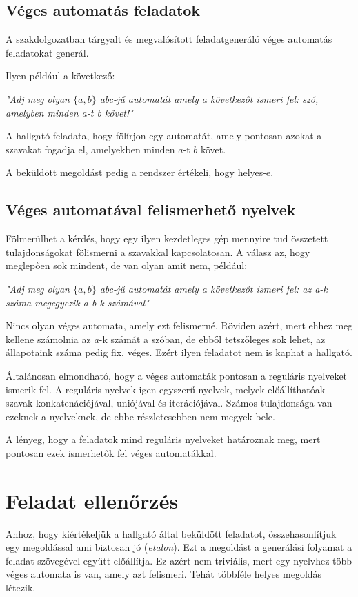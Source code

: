 \documentclass[12pt]{report}
\theoremstyle{definition}
\begin{document}
\subsection{Véges automatás feladatok}
A szakdolgozatban tárgyalt és megvalósított feladatgeneráló véges automatás feladatokat generál.

Ilyen például a következő:

\textit{"Adj meg olyan $\{a,b\}$ abc-jű automatát amely a következőt ismeri fel: szó, amelyben minden a-t b követ!"}

A hallgató feladata, hogy fölírjon egy automatát, amely pontosan azokat a szavakat fogadja el, amelyekben minden $a$-t $b$ követ.

A beküldött megoldást pedig a rendszer értékeli, hogy helyes-e.

\subsection{Véges automatával felismerhető nyelvek}
Fölmerülhet a kérdés, hogy egy ilyen kezdetleges gép mennyire tud összetett tulajdonságokat fölismerni a szavakkal kapcsolatosan. A válasz az, hogy meglepően sok mindent, de van olyan amit nem, például:

\textit{"Adj meg olyan $\{a,b\}$ abc-jű automatát amely a következőt ismeri fel: az a-k száma megegyezik a b-k számával"}

Nincs olyan véges automata, amely ezt felismerné. Röviden azért, mert ehhez meg kellene számolnia az $a$-k számát a szóban, de ebből tetszőleges sok lehet, az állapotaink száma pedig fix, véges. Ezért ilyen feladatot nem is kaphat a hallgató.

Általánosan elmondható, hogy a véges automaták pontosan a reguláris nyelveket ismerik fel. A reguláris nyelvek igen egyszerű nyelvek, melyek előállíthatóak szavak konkatenációjával, uniójával és iterációjával. Számos tulajdonsága van ezeknek a nyelveknek, de ebbe részletesebben nem megyek bele.

A lényeg, hogy a feladatok mind reguláris nyelveket határoznak meg, mert pontosan ezek ismerhetők fel véges automatákkal.

\section{Feladat ellenőrzés}
Ahhoz, hogy kiértékeljük a hallgató által beküldött feladatot, összehasonlítjuk egy megoldással ami biztosan jó (\textit{etalon}). Ezt a megoldást a generálási folyamat a feladat szövegével együtt előállítja. Ez azért nem triviális, mert egy nyelvhez több véges automata is van, amely azt felismeri. Tehát többféle helyes megoldás létezik.
\end{document}
